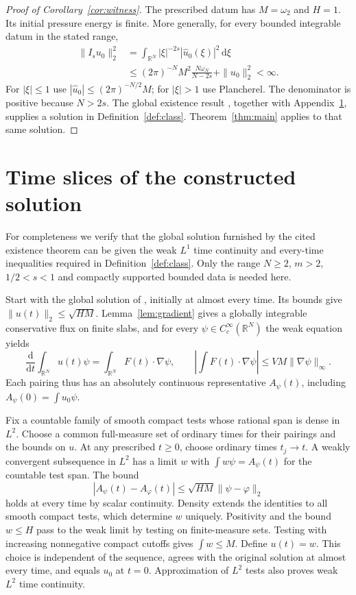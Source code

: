 \documentclass[11pt]{article}
\theoremstyle{definition}
\newcommand{\R}{\mathbb R}
\newcommand{\dd}{\,\mathrm d}
\begin{document}
\begin{proof}[Proof of Corollary~\ref{cor:witness}]
The prescribed datum has $M=\omega_2$ and $H=1$. Its initial pressure energy is finite. More generally, for every bounded integrable datum in the stated range,
\begin{align*}
 \|I_su_0\|_2^2
 &=\int_{\R^N}|\xi|^{-2s}|\widehat u_0(\xi)|^2\dd\xi\\
 &\le(2\pi)^{-N}M^2\frac{N\omega_N}{N-2s}+\|u_0\|_2^2<\infty.
\end{align*}
For $|\xi|\le1$ use $|\widehat u_0|\le(2\pi)^{-N/2}M$; for $|\xi|>1$ use Plancherel. The denominator is positive because $N>2s$.
The global existence result \cite[Theorem 5.1 and Remark 4]{STVsurvey}, together with Appendix~\ref{app:traces}, supplies a solution in Definition~\ref{def:class}. Theorem~\ref{thm:main} applies to that same solution.
\end{proof}

\appendix
\section{Time slices of the constructed solution}\label{app:traces}
For completeness we verify that the global solution furnished by the cited existence theorem can be given the weak $L^1$ time continuity and every-time inequalities required in Definition~\ref{def:class}. Only the range $N\ge2$, $m>2$, $1/2<s<1$ and compactly supported bounded data is needed here.

Start with the global solution of \cite[Theorem 5.1 and Remark 4]{STVsurvey}, initially at almost every time. Its bounds give $\|u(t)\|_2\le\sqrt{HM}$. Lemma~\ref{lem:gradient} gives a globally integrable conservative flux on finite slabs, and for every $\psi\in C_c^\infty(\R^N)$ the weak equation yields
\begin{equation}\label{eq:trace-pairing}
 \frac{\mathrm d}{\mathrm dt}\int_{\R^N}u(t)\psi
 =\int_{\R^N}F(t)\cdot\nabla\psi,
 \qquad \left|\int F(t)\cdot\nabla\psi\right|
 \le VM\|\nabla\psi\|_\infty.
\end{equation}
Each pairing thus has an absolutely continuous representative $A_\psi(t)$, including $A_\psi(0)=\int u_0\psi$.

Fix a countable family of smooth compact tests whose rational span is dense in $L^2$. Choose a common full-measure set of ordinary times for their pairings and the bounds on $u$. At any prescribed $t\ge0$, choose ordinary times $t_j\to t$. A weakly convergent subsequence in $L^2$ has a limit $w$ with
$\int w\psi=A_\psi(t)$ for the countable test span. The bound
\[
 |A_\psi(t)-A_\varphi(t)|\le\sqrt{HM}\|\psi-\varphi\|_2
\]
holds at every time by scalar continuity. Density extends the identities to all smooth compact tests, which determine $w$ uniquely. Positivity and the bound $w\le H$ pass to the weak limit by testing on finite-measure sets. Testing with increasing nonnegative compact cutoffs gives $\int w\le M$. Define $u(t)=w$. This choice is independent of the sequence, agrees with the original solution at almost every time, and equals $u_0$ at $t=0$. Approximation of $L^2$ tests also proves weak $L^2$ time continuity.
\end{document}
